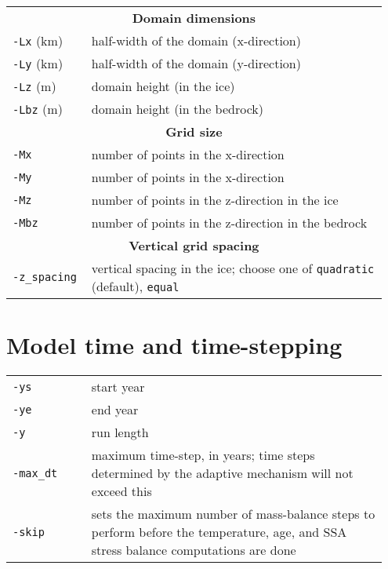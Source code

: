 \documentclass[landscape]{article}
\newcommand{\tabletitle}[1]{\multicolumn{2}{c}{\textbf{#1}}}
\begin{document}
\begin{textblock}{15}
\begin{tabular}{@{}p{0.2\linewidth}p{0.75\linewidth}@{}}
\tabletitle{Domain dimensions} \\
 \texttt{-Lx} (km) & half-width of the domain \mbox{(x-direction)}\\
  \texttt{-Ly} (km) & half-width of the domain \mbox{(y-direction)}\\
  \texttt{-Lz} (m) & domain height (in the ice)\\
  \texttt{-Lbz} (m) & domain height (in the bedrock)\\
\tabletitle{Grid size} \\
 \texttt{-Mx} & number of points in the x-direction\\
  \texttt{-My} & number of points in the x-direction\\
  \texttt{-Mz} & number of points in the z-direction in the ice\\
  \texttt{-Mbz} & number of points in the z-direction in the bedrock\\
\tabletitle{Vertical grid spacing} \\
 \texttt{-z_spacing} & vertical spacing in the ice; choose one of \texttt{quadratic} (default), \texttt{equal}\\
\end{tabular}

\section{Model time and time-stepping}
\label{sec:model-time} \label{sec:time-stepping}
\begin{tabular}{@{}p{0.2\linewidth}p{0.75\linewidth}@{}}
  \texttt{-ys} & start year \\
  \texttt{-ye} & end year \\
  \texttt{-y} & run length \\
  \texttt{-max_dt} & maximum time-step, in years; time steps determined by
  the adaptive mechanism will not exceed this\\
  \texttt{-skip} &  sets the maximum number of mass-balance steps to perform
  before the temperature, age, and SSA stress balance computations
  are done\\
\end{tabular}



\end{textblock}
\end{document}
